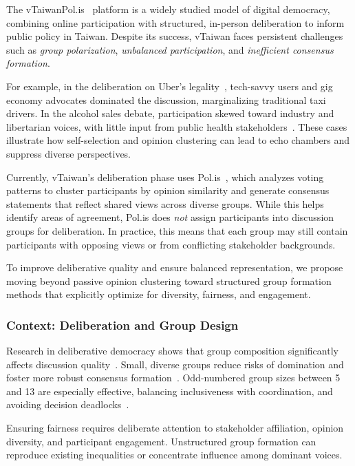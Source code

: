 The vTaiwanPol.is~\parencite{vtaiwan} platform is a widely studied model of digital democracy,
combining online participation with structured, in-person deliberation to inform public policy in Taiwan.
Despite its success, vTaiwan faces persistent challenges such as \textit{group polarization},
\textit{unbalanced participation}, and \textit{inefficient consensus formation}.

For example, in the deliberation on
Uber's legality~\parencite{polisUber},
tech-savvy users and gig economy advocates dominated the discussion,
marginalizing traditional taxi drivers.
In the alcohol sales debate, participation skewed toward industry and libertarian voices,
with little input from public health stakeholders~\parencite{tiku2018taiwan}.
These cases illustrate how self-selection and opinion clustering can lead to echo chambers
and suppress diverse perspectives.

Currently, vTaiwan's deliberation phase uses Pol.is~\parencite{polis},
which analyzes voting patterns to cluster participants by opinion similarity
and generate consensus statements that reflect shared views across diverse groups.
While this helps identify areas of agreement,
Pol.is does \textit{not} assign participants into discussion groups for deliberation.
In practice, this means that each group may still contain participants with opposing views
or from conflicting stakeholder backgrounds.

To improve deliberative quality and ensure balanced representation,
we propose moving beyond passive opinion clustering
toward structured group formation methods that explicitly optimize for diversity, fairness, and engagement.

\subsubsection*{Context: Deliberation and Group Design}

Research in deliberative democracy shows that group composition
significantly affects discussion quality~\parencite{fay2000group}.
Small, diverse groups reduce risks of domination
and foster more robust consensus formation~\parencite{anagnostopoulos2012groupformation}.
Odd-numbered group sizes between 5 and 13 are especially effective,
balancing inclusiveness with coordination,
and avoiding decision deadlocks~\parencite{fishkin2009deliberative, menon2011oddgroups}.

Ensuring fairness requires deliberate attention to stakeholder affiliation, opinion diversity,
and participant engagement.
Unstructured group formation can reproduce existing inequalities
or concentrate influence among dominant voices.

